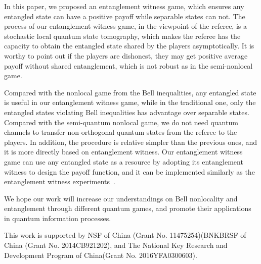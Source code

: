 \documentclass[twocolumn,pra,showpacs,superscriptaddress]{revtex4-1}
\begin{document}
In this paper, we proposed an entanglement witness game, which ensures any
entangled state can have a positive payoff while separable states can
not. The process of our entanglement witness game, in the viewpoint of the
referee, is a stochastic local quantum state tomography, which makes
the referee has the capacity to obtain the entangled state shared by
the players asymptotically. It is worthy to point out if the players
are dishonest, they may get positive average payoff without shared
entanglement, which is not robust as in the semi-nonlocal game.

Compared with the nonlocal game from the Bell inequalities, any
entangled state is useful in our entanglement witness game, while in the
traditional one, only the entangled states violating Bell inequalities
has advantage over separable states. Compared with the semi-quantum
nonlocal game, we do not need quantum channels to transfer
non-orthogonal quantum states from the referee to the players. In
addition, the procedure is relative simpler than the previous ones,
and it is more directly based on entanglement witness. Our entanglement witness game
 can use any entangled state as a resource by adopting its
entanglement witness to design the payoff function, and it can
be implemented similarly as the entanglement witness
experiments~\cite{barb}\cite{bour}.

We hope our work will increase our understandings on Bell nonlocality
and entanglement through different quantum games, and promote their
applications in quantum information processes.


\begin{acknowledgments}
 This work is supported by NSF of China (Grant No. 11475254)(BNKBRSF
 of China (Grant No. 2014CB921202), and The National Key Research and
 Development Program of China(Grant No. 2016YFA0300603).
\end{acknowledgments}



\end{document}
